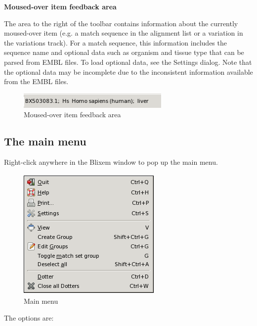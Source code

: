 \documentclass[letterpaper]{article}
\begin{document}
\bigskip

{\bfseries
Moused-over item feedback area}

The area to the right of the toolbar contains information about the currently moused-over item (e.g. a match sequence in the alignment list or a variation in the variations track). For a match sequence, this information includes the sequence name and optional data such as organism and tissue type that can be parsed from EMBL files. To load optional data, see the Settings dialog. Note that the optional data may be incomplete due to the inconsistent information available from the EMBL files.

\begin{figure}
\centering
\color[rgb]{0.30980393,0.5058824,0.7411765}
\includegraphics[width=7.355cm,height=0.771cm]{img_view_feedback_area.png}
\caption{Moused-over item feedback area}
\end{figure}

\bigskip

{\color[rgb]{0.30980393,0.5058824,0.7411765}\subsection[The main menu]{The main menu}}
\hypertarget{RefHeading1781056909880}{}{
Right-click anywhere in the Blixem window to pop up the main menu.}

\begin{figure}
\centering
\color[rgb]{0.30980393,0.5058824,0.7411765}
\includegraphics[width=6.951cm,height=6.428cm]{img_menu_right_click.png}
\caption{Main menu}
\end{figure}

{The options are:}
\end{document}
